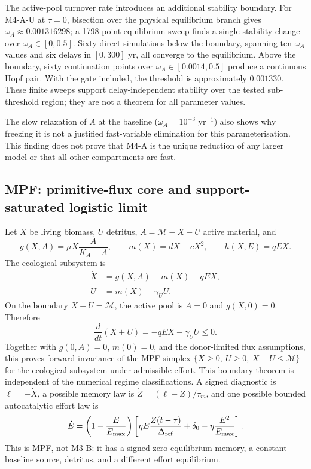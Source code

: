 \documentclass[11pt]{article}
\begin{document}
The active-pool turnover rate introduces an additional stability boundary. For M4-A-U at $\tau=0$, bisection over the physical equilibrium branch gives $\omega_A\approx0.001316298$; a 1798-point equilibrium sweep finds a single stability change over $\omega_A\in[0,0.5]$. Sixty direct simulations below the boundary, spanning ten $\omega_A$ values and six delays in $[0,300]$ yr, all converge to the equilibrium. Above the boundary, sixty continuation points over $\omega_A\in[0.0014,0.5]$ produce a continuous Hopf pair. With the gate included, the threshold is approximately $0.001330$. These finite sweeps support delay-independent stability over the tested sub-threshold region; they are not a theorem for all parameter values.

The slow relaxation of $A$ at the baseline ($\omega_A=10^{-3}$ yr$^{-1}$) also shows why freezing it is not a justified fast-variable elimination for this parameterisation. This finding does not prove that M4-A is the unique reduction of any larger model or that all other compartments are fast.

\subsection{MPF: primitive-flux core and support-saturated logistic limit}

Let $X$ be living biomass, $U$ detritus, $A=\mathcal M-X-U$ active material, and
\[
g(X,A)=\mu X\frac{A}{K_A+A},
\qquad
m(X)=dX+cX^2,
\qquad
h(X,E)=qEX.
\]
The ecological subsystem is
\begin{align}
\dot X&=g(X,A)-m(X)-qEX,\\
\dot U&=m(X)-\gamma_UU.
\end{align}
On the boundary $X+U=\mathcal M$, the active pool is $A=0$ and $g(X,0)=0$. Therefore
\[
\frac{d}{dt}(X+U)=-qEX-\gamma_UU\le0.
\]
Together with $g(0,A)=0$, $m(0)=0$, and the donor-limited flux assumptions, this proves forward invariance of the MPF simplex $\{X\ge0,\ U\ge0,\ X+U\le\mathcal M\}$ for the ecological subsystem under admissible effort. This boundary theorem is independent of the numerical regime classifications.
A signed diagnostic is $\ell=-\dot X$, a possible memory law is $\dot Z=(\ell-Z)/\tau_m$, and one possible bounded autocatalytic effort law is
\begin{equation}
\dot E=\left(1-\frac{E}{E_{\max}}\right)
\left[
\eta E\frac{Z(t-\tau)}{\Delta_{\rm ref}}
+\delta_0-\eta\frac{E^2}{E_{\max}}
\right].
\label{eq:MPF-E}
\end{equation}
This is MPF, not M3-B: it has a signed zero-equilibrium memory, a constant baseline source, detritus, and a different effort equilibrium.
\end{document}
